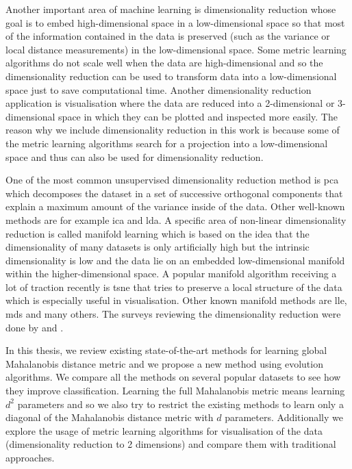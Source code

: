 \documentclass[12pt,a4paper]{report}
\begin{document}
Another important area of machine learning is dimensionality reduction whose goal is to embed high-dimensional space in a low-dimensional space so that most of the information contained in the data is preserved (such as the variance or local distance measurements) in the low-dimensional space. Some metric learning algorithms do not scale well when the data are high-dimensional and so the dimensionality reduction can be used to transform data into a low-dimensional space just to save computational time. Another dimensionality reduction application is visualisation where the data are reduced into a 2-dimensional or 3-dimensional space in which they can be plotted and inspected more easily. The reason why we include dimensionality reduction in this work is because some of the metric learning algorithms search for a projection into a low-dimensional space and thus can also be used for dimensionality reduction.

One of the most common unsupervised dimensionality reduction method is \ac{pca} \citep{jolliffe2002principal} which decomposes the dataset in a set of successive orthogonal components that explain a maximum amount of the variance inside of the data. Other well-known methods are for example \ac{ica} and \ac{lda}. A specific area of non-linear dimensionality reduction is called manifold learning which is based on the idea that the dimensionality of many datasets is only artificially high but the intrinsic dimensionality is low and the data lie on an embedded low-dimensional manifold within the higher-dimensional space. A popular manifold algorithm receiving a lot of traction recently is \ac{tsne} \citep{maaten2008visualizing} that tries to preserve a local structure of the data which is especially useful in visualisation. Other known manifold methods are \ac{lle}, \ac{mds} and many others. The surveys reviewing the dimensionality reduction were done by \cite{fodor2002survey} and \cite{van2009dimensionality}.

In this thesis, we review existing state-of-the-art methods for learning global Mahalanobis distance metric and we propose a new method using evolution algorithms. We compare all the methods on several popular datasets to see how they improve classification. Learning the full Mahalanobis metric means learning $d^2$ parameters and so we also try to restrict the existing methods to learn only a diagonal of the Mahalanobis distance metric with $d$ parameters. Additionally we explore the usage of metric learning algorithms for visualisation of the data (dimensionality reduction to 2 dimensions) and compare them with traditional approaches.
\end{document}
